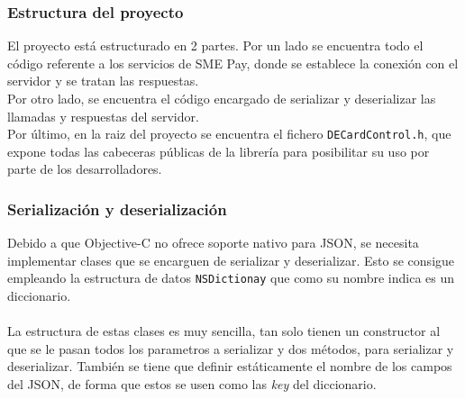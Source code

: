 \documentclass[a4paper, 12pt]{article}
\begin{document}
\subsubsection{Estructura del proyecto}
\label{sec-4-2-1}
El proyecto está estructurado en 2 partes. Por un lado se encuentra todo el código referente a los servicios de SME Pay, donde se establece la conexión con el servidor y se tratan las respuestas.
\\
Por otro lado, se encuentra el código encargado de serializar y deserializar las llamadas y respuestas del servidor.
\\
Por último, en la raiz del proyecto se encuentra el fichero \verb~DECardControl.h~, que expone todas las cabeceras públicas de la librería para posibilitar su uso por parte de los desarrolladores.
\subsubsection{Serialización y deserialización}
\label{sec-4-2-2}
Debido a que Objective-C no ofrece soporte nativo para JSON, se necesita implementar clases que se encarguen de serializar y deserializar. Esto se consigue empleando la estructura de datos \verb~NSDictionay~
que como su nombre indica es un diccionario.
\\
\\
La estructura de estas clases es muy sencilla, tan solo tienen un constructor al que se le pasan todos los parametros a serializar y dos métodos, para serializar y deserializar. También se tiene que definir
estáticamente el nombre de los campos del JSON, de forma que estos se usen como las \emph{key} del diccionario.
\end{document}
